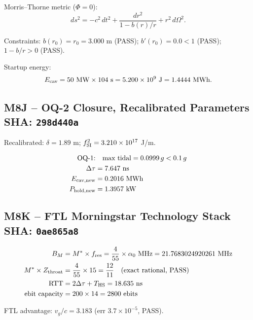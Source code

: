 \documentclass[12pt,letterpaper]{article}
\begin{document}
Morris--Thorne metric ($\Phi = 0$):
\begin{equation}
  ds^2 = -c^2\,dt^2 + \frac{dr^2}{1-b(r)/r} + r^2\,d\Omega^2.
  \label{eq:MT}
\end{equation}

Constraints: $b(r_0) = r_0 = 3.000$ m (PASS);
$b'(r_0) = 0.0 < 1$ (PASS); $1 - b/r > 0$ (PASS).

Startup energy:
\begin{equation}
  E_{\rm cav} = 50 \text{ MW} \times 104 \text{ s}
  = 5.200 \times 10^9 \text{ J} = 1.4444 \text{ MWh}.
  \label{eq:Ecav}
\end{equation}

\subsection{M8J -- OQ-2 Closure, Recalibrated Parameters \hfill SHA: \texttt{298d440a}}

Recalibrated: $\delta = 1.89$ m; $f^2_{\rm SI} = 3.210 \times 10^{17}$ J/m.

\begin{align}
  \text{OQ-1:}&\quad \text{max tidal} = 0.0999\,g < 0.1\,g \label{eq:tidal}\\
  \Delta\tau &= 7.647 \text{ ns} \label{eq:transit}\\
  E_{\rm cav,new} &= 0.2016 \text{ MWh} \\
  P_{\rm hold,new} &= 1.3957 \text{ kW}
\end{align}

\subsection{M8K -- FTL Morningstar Technology Stack \hfill SHA: \texttt{0ae865a8}}

\begin{align}
  B_M &= M^* \times f_{\rm res}
  = \frac{4}{55} \times \alpha_0 \text{ MHz}
  = 21.7683024920261 \text{ MHz}  \label{eq:BM}\\
  M^* \times Z_{\rm throat}
  &= \frac{4}{55} \times 15 = \frac{12}{11}
    \quad\text{(exact rational, PASS)}\\
  \mathrm{RTT} &= 2\Delta\tau + T_{\rm HS} = 18.635 \text{ ns}  \label{eq:RTT}\\
  \text{ebit capacity} &= 200 \times 14 = 2800 \text{ ebits}
\end{align}

FTL advantage: $v_g/c = 3.183$ (err $3.7 \times 10^{-5}$, PASS).
\end{document}
